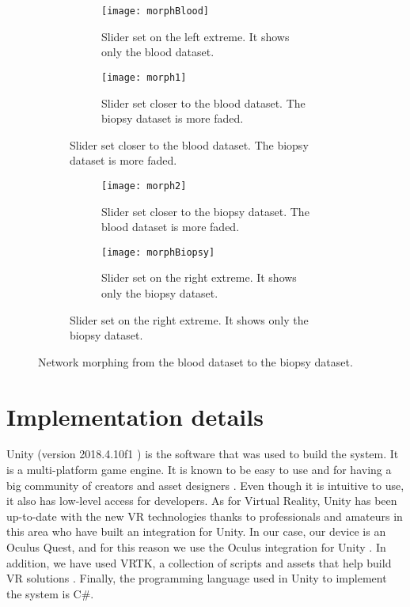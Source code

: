 \begin{figure}[h!]
    \centering
    \begin{subfigure}{\textwidth}
      \begin{subfigure}[t]{0.5\textwidth}
          \centering
          \texttt{[image: morphBlood]}
          \caption{Slider set on the left extreme. It shows only the blood dataset.}
          \label{fig:morphBlood}
      \end{subfigure}
      \begin{subfigure}[t]{0.5\textwidth}
          \centering
          \texttt{[image: morph1]}
          \caption{Slider set closer to the blood dataset. The biopsy dataset is more faded.}
          \label{fig:morph1}
      \end{subfigure}
    \end{subfigure}

    \begin{subfigure}{\textwidth}
      \begin{subfigure}[t]{0.5\textwidth}
          \centering
          \texttt{[image: morph2]}
          \caption{Slider set closer to the biopsy dataset. The blood dataset is more faded.}
          \label{fig:morph2}
      \end{subfigure}
      \begin{subfigure}[t]{0.5\textwidth}
          \centering
          \texttt{[image: morphBiopsy]}
          \caption{Slider set on the right extreme. It shows only the biopsy dataset.}
          \label{fig:morphbiopsy}
      \end{subfigure}
    \end{subfigure}

    \caption{Network morphing from the blood dataset to the biopsy dataset.}
    \label{fig:morphing}
\end{figure}

\section{Implementation details}
Unity (version 2018.4.10f1 \cite{unity2018}) is the software that was used to build the system. It is a multi-platform game engine. It is known to be easy to use and for having a big community of creators and asset designers \cite{developing_vr_unity}. Even though it is intuitive to use, it also has low-level access for developers. As for Virtual Reality, Unity has been up-to-date with the new VR technologies thanks to professionals and amateurs in this area who have built an integration for Unity. In our case, our device is an Oculus Quest, and for this reason we use the Oculus integration for Unity \cite{oculus_unity_integration}. In addition, we have used VRTK, a collection of scripts and assets that help build VR solutions \cite{vrtk_what}. Finally, the programming language used in Unity to implement the system is C\#.

